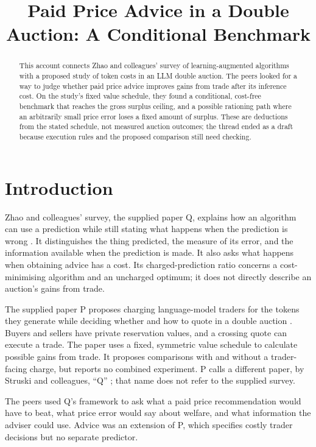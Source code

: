 \documentclass{article}
\title{Paid Price Advice in a Double Auction: A Conditional Benchmark}
\begin{document}
\maketitle

\begin{abstract}
This account connects Zhao and colleagues' survey of learning-augmented algorithms with a proposed study
of token costs in an LLM double auction. The peers looked for a way to judge whether paid price advice
improves gains from trade after its inference cost. On the study's fixed value schedule, they found a
conditional, cost-free benchmark that reaches the gross surplus ceiling, and a possible rationing path
where an arbitrarily small price error loses a fixed amount of surplus. These are deductions from the
stated schedule, not measured auction outcomes; the thread ended as a draft because execution rules and
the proposed comparison still need checking.
\end{abstract}

\section{Introduction}

Zhao and colleagues' survey, the supplied paper Q, explains how an algorithm can use a prediction while
still stating what happens when the prediction is wrong \cite{zhao2026learning}. It distinguishes the
thing predicted, the measure of its error, and the information available when the prediction is made. It
also asks what happens when obtaining advice has a cost. Its charged-prediction ratio concerns a
cost-minimising algorithm and an uncharged optimum; it does not directly describe an auction's gains from
trade.

The supplied paper P proposes charging language-model traders for the tokens they generate while deciding
whether and how to quote in a double auction \cite{pathfinder2026price}. Buyers and sellers have private
reservation values, and a crossing quote can execute a trade. The paper uses a fixed, symmetric value
schedule to calculate possible gains from trade. It proposes comparisons with and without a trader-facing
charge, but reports no combined experiment. P calls a different paper, by Struski and colleagues, ``Q''
\cite{struski2026competitive}; that name does not refer to the supplied survey.

The peers used Q's framework to ask what a paid price recommendation would have to beat, what price error
would say about welfare, and what information the adviser could use. Advice was an extension of P, which
specifies costly trader decisions but no separate predictor.
\end{document}
